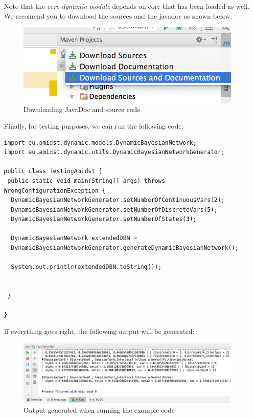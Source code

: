 \documentclass[10pt,a4paper]{article}
\begin{document}
Note that the \emph{core-dynamic module} depends on {core }{}that has
been loaded as well. We recomend you to download the sources and the
javadoc as shown below.


\begin{figure}[h!]
	\centering	
	\includegraphics[width=12cm]{img/use_amidst08.png}
	\caption{Downloading JavaDoc and source code}
\end{figure}

\newpage 


\noindent Finally, for testing purposes, we can run the following
code:\newline 

\begin{verbatim}
import eu.amidst.dynamic.models.DynamicBayesianNetwork;
import eu.amidst.dynamic.utils.DynamicBayesianNetworkGenerator;

public class TestingAmidst {
 public static void main(String[] args) throws WrongConfigurationException {
  DynamicBayesianNetworkGenerator.setNumberOfContinuousVars(2);
  DynamicBayesianNetworkGenerator.setNumberOfDiscreteVars(5);
  DynamicBayesianNetworkGenerator.setNumberOfStates(3);

  DynamicBayesianNetwork extendedDBN = 
  DynamicBayesianNetworkGenerator.generateDynamicBayesianNetwork();

  System.out.println(extendedDBN.toString());


 }

}
\end{verbatim}

\noindent If everything goes right, the following output will be
generated:\newline 


\begin{figure}[h!]
	\centering	
	\includegraphics[width=12cm]{img/use_amidst09.png}
	\caption{Output generated when running the example code}
\end{figure}
\end{document}
